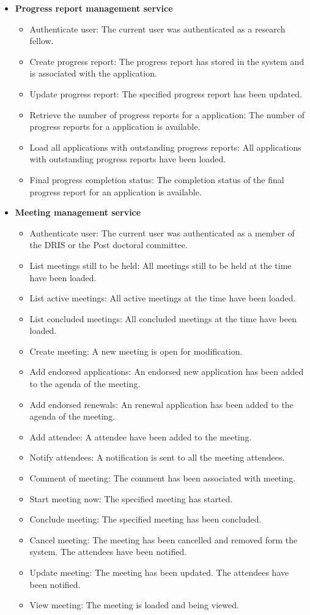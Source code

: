 \documentclass[12pt]{article}
\begin{document}
\begin{itemize}
	\item \textbf{Progress report management service}
		\begin{itemize}
			\item Authenticate user: The current user was authenticated as a research fellow.
			\item Create progress report: The progress report has stored in the system and is associated with the application.
			\item Update progress report: The specified progress report has been updated.
			\item Retrieve the number of progress reports for a application: The number of progress reports for a application is available.
			\item Load all applications with outstanding progress reports: All applications with outstanding progress reports have been loaded.
			\item Final progress completion status: The completion status of the final progress report for an application is available.							
		\end{itemize}
	
	\item \textbf{Meeting management service}
		\begin{itemize}
			\item Authenticate user: The current user was authenticated as a member of the DRIS or the Post doctoral committee.
			\item List meetings still to be held: All meetings still to be held at the time have been loaded.
			\item List active meetings: All active meetings at the time have been loaded.
			\item List concluded meetings: All concluded meetings at the time have been loaded.
			\item Create meeting: A new meeting is open for modification.
			\item Add endorsed applications: An endorsed new application has been added to the agenda of the meeting.
			\item Add endorsed renewals: An renewal application has been added to the agenda of the meeting.
			\item Add attendee: A attendee have been added to the meeting.
			\item Notify attendees: A notification is sent to all the meeting attendees.			
			\item Comment of meeting: The comment has been associated with meeting.
			\item Start meeting now: The specified meeting has started.
			\item Conclude meeting: The specified meeting has been concluded.
			\item Cancel meeting: The meeting has been cancelled and removed form the system. The attendees have been notified.
			\item Update meeting: The meeting has been updated. The attendees have been notified.
			\item View meeting: The meeting is loaded and being viewed.							
		\end{itemize}
		

\end{itemize}
\end{document}
